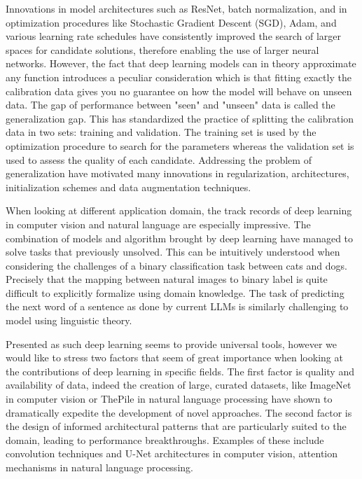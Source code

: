 \begin{bibunit}
Innovations in model architectures such as ResNet, batch normalization, and in optimization procedures like Stochastic Gradient Descent (SGD), Adam, and various learning rate schedules have consistently improved the search of larger spaces for candidate solutions, therefore  enabling the use of larger neural networks. 
However, the fact that deep learning models can in theory approximate any function introduces a peculiar consideration which is that fitting exactly the calibration data gives you no guarantee on how the model will behave on unseen data. The gap of performance between "seen" and "unseen" data is called the generalization gap. This has standardized the practice of splitting the calibration data in two sets: training and validation. The training set is used  by the optimization procedure to search for the parameters whereas the validation set is used to assess the quality of each candidate. 
Addressing the problem of generalization have motivated many innovations in regularization, architectures, initialization schemes and data augmentation techniques.


When looking at different application domain, the track records of deep learning in computer vision and natural language are especially impressive. 
The combination of models and algorithm brought by deep learning have managed to solve tasks that previously unsolved.
This can be intuitively understood when considering the challenges of a binary classification task between cats and dogs.
Precisely that the mapping between natural images to binary label is quite difficult to explicitly formalize using domain knowledge. 
The task of predicting the next word of a sentence as done by current LLMs is similarly challenging to model using linguistic theory.

Presented as such deep learning seems to provide universal tools,  
however we would like to stress two factors that seem of great importance when looking at the contributions of deep learning in specific fields.
The first factor is quality and availability of data, indeed the creation of large, curated datasets, like ImageNet in computer vision or ThePile in natural language processing have shown to dramatically expedite the development of novel approaches. 
The second factor is the design of informed architectural patterns that are particularly suited to the domain, leading to performance breakthroughs. Examples of these include convolution techniques and U-Net architectures in computer vision, attention mechanisms in natural language processing.



\end{bibunit}
